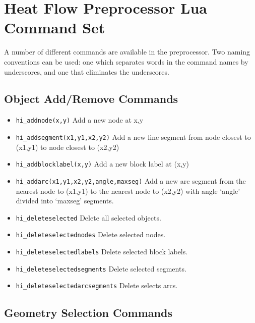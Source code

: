 \section{Heat Flow Preprocessor Lua Command Set}

A number of different commands are available in the preprocessor.
Two naming conventions can be used: one which separates words in
the command names by underscores, and one that eliminates the
underscores.

\subsection{Object Add/Remove Commands}
\begin{itemize}
\item {\tt hi\_addnode(x,y)} Add a new node at x,y

\item {\tt hi\_addsegment(x1,y1,x2,y2)} Add a new line segment from node closest to
(x1,y1) to node closest to (x2,y2)

\item {\tt hi\_addblocklabel(x,y)} Add a new block label at (x,y)

\item {\tt hi\_addarc(x1,y1,x2,y2,angle,maxseg)} Add a new arc segment from the
nearest node to (x1,y1) to the nearest node to (x2,y2) with angle `angle'
divided into `maxseg' segments.

\item {\tt hi\_deleteselected} Delete all selected objects.

\item {\tt hi\_deleteselectednodes} Delete selected nodes.

\item {\tt hi\_deleteselectedlabels} Delete selected block labels.

\item {\tt hi\_deleteselectedsegments} Delete selected segments.

\item {\tt hi\_deleteselectedarcsegments} Delete selects arcs.
\end{itemize}


\subsection{Geometry Selection Commands}

